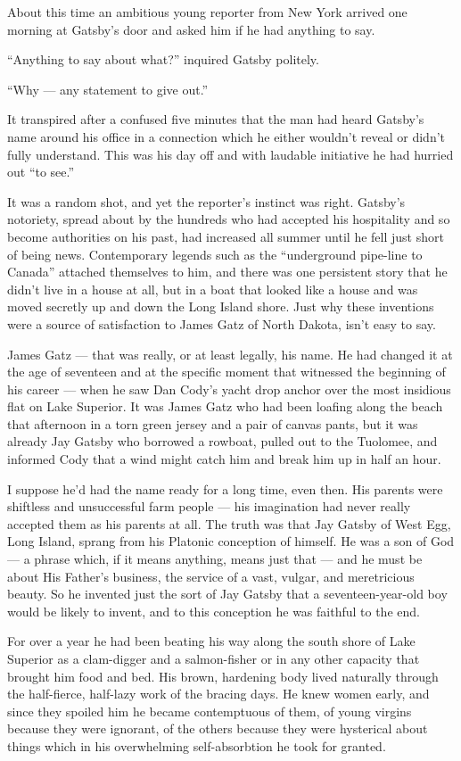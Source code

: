 \documentclass{znotebook}
\begin{document}
About this time an ambitious young reporter from New York arrived one morning at Gatsby’s door and asked him if he had anything to say.

``Anything to say about what?'' inquired Gatsby politely.

``Why — any statement to give out.''

It transpired after a confused five minutes that the man had heard Gatsby’s name around his office in a connection which he either wouldn’t reveal or didn’t fully understand. This was his day off and with laudable initiative he had hurried out ``to see.''

It was a random shot, and yet the reporter’s instinct was right. Gatsby’s notoriety, spread about by the hundreds who had accepted his hospitality and so become authorities on his past, had increased all summer until he fell just short of being news. Contemporary legends such as the ``underground pipe-line to Canada'' attached themselves to him, and there was one persistent story that he didn’t live in a house at all, but in a boat that looked like a house and was moved secretly up and down the Long Island shore. Just why these inventions were a source of satisfaction to James Gatz of North Dakota, isn’t easy to say.

James Gatz — that was really, or at least legally, his name. He had changed it at the age of seventeen and at the specific moment that witnessed the beginning of his career — when he saw Dan Cody’s yacht drop anchor over the most insidious flat on Lake Superior. It was James Gatz who had been loafing along the beach that afternoon in a torn green jersey and a pair of canvas pants, but it was already Jay Gatsby who borrowed a rowboat, pulled out to the Tuolomee, and informed Cody that a wind might catch him and break him up in half an hour.

I suppose he’d had the name ready for a long time, even then. His parents were shiftless and unsuccessful farm people — his imagination had never really accepted them as his parents at all. The truth was that Jay Gatsby of West Egg, Long Island, sprang from his Platonic conception of himself. He was a son of God — a phrase which, if it means anything, means just that — and he must be about His Father’s business, the service of a vast, vulgar, and meretricious beauty. So he invented just the sort of Jay Gatsby that a seventeen-year-old boy would be likely to invent, and to this conception he was faithful to the end.

For over a year he had been beating his way along the south shore of Lake Superior as a clam-digger and a salmon-fisher or in any other capacity that brought him food and bed. His brown, hardening body lived naturally through the half-fierce, half-lazy work of the bracing days. He knew women early, and since they spoiled him he became contemptuous of them, of young virgins because they were ignorant, of the others because they were hysterical about things which in his overwhelming self-absorbtion he took for granted.
\end{document}

